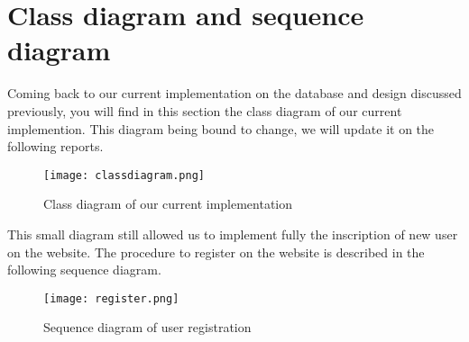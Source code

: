 \section{Class diagram and sequence diagram}

Coming back to our current implementation on the database and design discussed previously, you will find in this section the class diagram of our current implemention. This diagram being bound to change, we will update it on the following reports.

\begin{figure}[H]
	\centering
	\texttt{[image: classdiagram.png]}
	\caption{Class diagram of our current implementation}
	\label{fig:length_eight_mouse}
\end{figure}

This small diagram still allowed us to implement fully the inscription of new user on the website. The procedure to register on the website is described in the following sequence diagram.

\begin{figure}
	\centering
	\texttt{[image: register.png]}
	\caption{Sequence diagram of user registration}
	\label{fig:length_eight_mouse}
\end{figure}